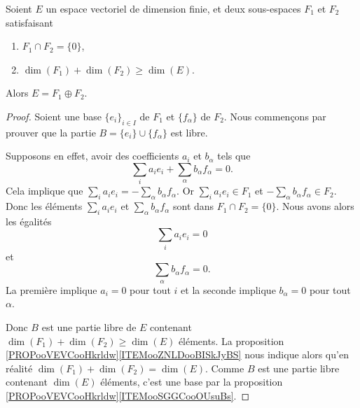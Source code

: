 \begin{proposition}               \label{PROPooCASNooEqisqa}
	Soient \( E\) un espace vectoriel de dimension finie, et deux sous-espaces \( F_1\) et \( F_2\) satisfaisant
	\begin{enumerate}
		\item
		      \( F_1\cap F_2=\{ 0 \}\),
		\item
		      \( \dim(F_1)+\dim(F_2)\geq \dim(E)\).
	\end{enumerate}
	Alors \( E=F_1\oplus F_2\).
\end{proposition}

\begin{proof}
	Soient une base \( \{ e_i \}_{i\in I}\) de \( F_1\) et \( \{ f_{\alpha} \}\) de \( F_2\). Nous commençons par prouver que la partie \( B=\{ e_i \}\cup \{ f_{\alpha} \}\) est libre.

	Supposons en effet, avoir des coefficients \( a_i\) et \( b_{\alpha}\) tels que
	\begin{equation}
		\sum_i a_ie_i+\sum_{\alpha}b_{\alpha}f_{\alpha}=0.
	\end{equation}
	Cela implique que \( \sum_ia_ie_i=-\sum_{\alpha}b_{\alpha}f_{\alpha}\). Or \( \sum_ia_ie_i\in F_1\) et \( -\sum_{\alpha}b_{\alpha}f_{\alpha}\in F_2\). Donc les éléments \( \sum_i a_ie_i\) et \( \sum_{\alpha}b_{\alpha}f_{\alpha}\) sont dans \( F_1\cap F_2=\{ 0 \}\). Nous avons alors les égalités
	\begin{equation}
		\sum_i a_ie_i=0
	\end{equation}
	et
	\begin{equation}
		\sum_{\alpha}b_{\alpha}f_{\alpha}=0.
	\end{equation}
	La première implique \( a_i=0\) pour tout \( i\) et la seconde implique \( b_{\alpha}=0\) pour tout \( \alpha\).

	Donc \( B\) est une partie libre de \( E\) contenant \( \dim(F_1)+\dim(F_2)\geq \dim(E)\) éléments. La proposition \ref{PROPooVEVCooHkrldw}\ref{ITEMooZNLDooBISkJyBS} nous indique alors qu'en réalité \( \dim(F_1)+\dim(F_2)=\dim(E)\). Comme \( B\) est une partie libre contenant \( \dim(E)\) éléments, c'est une base par la proposition \ref{PROPooVEVCooHkrldw}\ref{ITEMooSGGCooOUsuBs}.
\end{proof}


